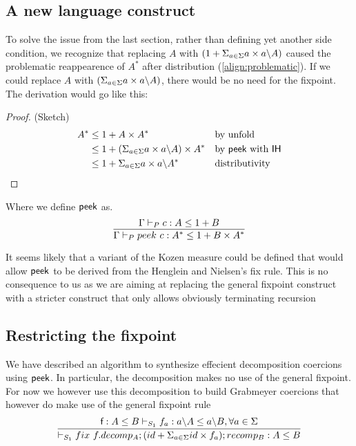 \documentclass[a4paper,UKenglish,cleveref, autoref, thm-restate]{lipics-v2021}
\begin{document}
\subsection{A new language construct}
To solve the issue from the last section, rather than defining yet another side condition, we recognize that replacing $A$ with $(1 + \Sigma_{a \in \Sigma} a\times a \backslash A)$ caused the problematic reappearence of $A^*$ after distribution (\ref{align:problematic}). If we could replace $A$ with $(\Sigma_{a \in \Sigma} a\times a \backslash A)$, there would be no need for the fixpoint. The derivation would go like this:
\begin{proof} (Sketch)
\begin{align}
A^* &\leq  1 + A \times A^* && \text{by unfold}\\
 &\leq 1 + (\Sigma_{a \in \Sigma} a\times a \backslash A) \times A^* && \text{by } \textsf{peek}~\text{with }\textsf{IH}\\
 &\leq 1 + \Sigma_{a \in \Sigma} a\times a \backslash A^* && \text{distributivity} 
\end{align}
\end{proof}
Where we define $\textsf{peek}$ as.
\[ \infer{\containsG{peek ~ c}{A^*}{1 + B \times A^*}}{\containsG{c}{A}{1 + B}} \]
\begin{remark}
It seems likely that a variant of the Kozen measure could be defined that would allow $\textsf{peek}$ to be derived from the Henglein and Nielsen's fix rule. This is no consequence to us as we are aiming at replacing the general fixpoint construct with a stricter construct that only allows obviously terminating recursion
\end{remark}

\subsection{Restricting the fixpoint}
We have described an algorithm to synthesize effecient decomposition coercions using $\textsf{peek}$. In particular, the decomposition makes no use of the general fixpoint. For now we however use this decomposition to build Grabmeyer coercions that however do make use of the general fixpoint rule
\[\infer{\containsP{}{\fix ~f.decomp_A;(id + \Sigma_{a \in \Sigma} id\times f_a); recomp_B}{A}{B}{S_1}}{\containsP{\dslcom{f} : A \leq B}{f_a}{\derive{a}{A}}{\derive{a}{B}}{S_1}, \forall a \in \Sigma} \]

\end{document}
